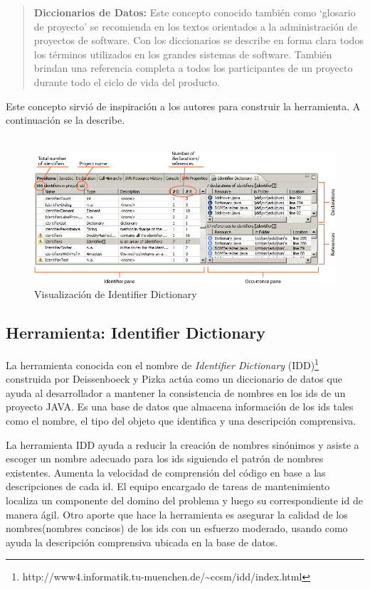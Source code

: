\documentclass[a4paper,12pt]{report}
\begin{document}
\begin{verse}
\textbf{Diccionarios de Datos:} Este concepto conocido también como `glosario de proyecto' se recomienda en los textos orientados a la administración de proyectos de software. Con los diccionarios se describe en forma clara todos los términos utilizados en los grandes sistemas de software. También brindan una referencia completa a todos los participantes de un proyecto durante todo el ciclo de vida del producto.
\end{verse}

Este concepto sirvió de inspiración a los autores para construir la herramienta. A continuación se la describe. \\ \\

\begin{figure}[h] %
\centerline{%
\includegraphics[scale= 0.55]{./idd_2.png}
}
\caption{Visualización de Identifier Dictionary}
\label{captura3}
\end{figure}
\pagebreak
\subsection{Herramienta: Identifier Dictionary}

La herramienta conocida con el nombre de \textit{Identifier Dictionary} (IDD)\footnote[1]{http://www4.informatik.tu-muenchen.de/\~{}ccsm/idd/index.html} construida por Deissenboeck y Pizka\cite{DFPM05} actúa como un diccionario de datos que ayuda al desarrollador a mantener la consistencia de nombres en los ids de un proyecto JAVA. Es una base de datos que almacena información de los ids tales como el nombre, el tipo del objeto que identifica y una descripción comprensiva.

La herramienta IDD ayuda a reducir la creación de nombres sinónimos y asiste a escoger un nombre adecuado para los ids siguiendo el patrón de nombres existentes. Aumenta la velocidad de comprensión del código en base a las descripciones de cada id. El equipo encargado de tareas de mantenimiento localiza un componente del domino del problema y luego su correspondiente id de manera ágil. Otro aporte que hace la herramienta es asegurar la calidad de los nombres(nombres concisos) de los ids con un esfuerzo moderado, usando como ayuda la descripción comprensiva ubicada en la base de datos\cite{DFPM05,LFBEX07}.
\end{document}
